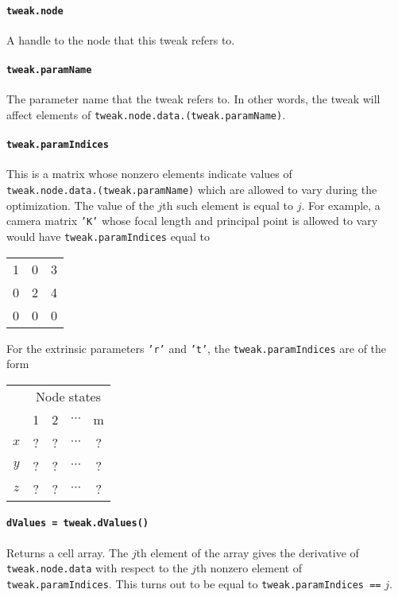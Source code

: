 \paragraph{\texttt{tweak.node}}

A handle to the node that this tweak refers to.

\paragraph{\texttt{tweak.paramName}}

The parameter name that the tweak refers to. In other words, the tweak will
affect elements of \texttt{tweak.node.data.(tweak.paramName)}.

\paragraph{\texttt{tweak.paramIndices}}

This is a matrix whose nonzero elements indicate values of \\
\texttt{tweak.node.data.(tweak.paramName)} 
which are allowed to vary during the optimization. The value of the $j$th such element is equal to $j$.
For example, a camera matrix \texttt{'K'} whose focal length and principal point is allowed to vary
would have \texttt{tweak.paramIndices} equal to

\begin{center}\begin{tabular}{ccc}
    1 & 0 & 3 \\
    0 & 2 & 4 \\
    0 & 0 & 0
\end{tabular}\end{center}

For the extrinsic parameters \texttt{'r'} and \texttt{'t'}, the \texttt{tweak.paramIndices} are of the form

\begin{center}\begin{tabular}{c|cccc}
	& \multicolumn{4}{c}{Node states} \\
	& 1 & 2 & $\cdots$ & m \\
	\hline
	$x$ & ? & ? & $\cdots$ & ? \\
	$y$ & ? & ? & $\cdots$ & ? \\
	$z$ & ? & ? & $\cdots$ & ?
\end{tabular}\end{center}

\paragraph{\texttt{dValues = tweak.dValues()}}

Returns a cell array. The $j$th element of the array gives the derivative of 
\texttt{tweak.node.data} with respect to the $j$th nonzero element of \texttt{tweak.paramIndices}.
This turns out to be equal to \texttt{tweak.paramIndices ==} $j$.
